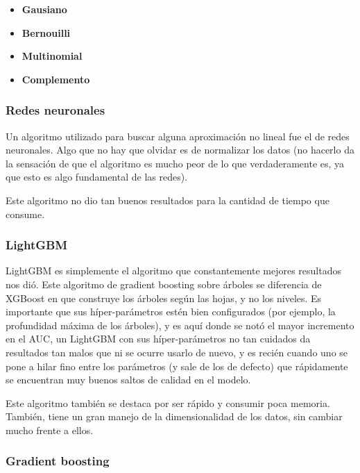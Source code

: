 \documentclass[a4paper]{article}
\begin{document}
\begin{itemize}
	\item \textbf{Gausiano}
	
	\item \textbf{Bernouilli}
	
	\item \textbf{Multinomial}	
	
 	\item \textbf{Complemento}
\end{itemize}


\subsubsection{Redes neuronales}

Un algoritmo utilizado para buscar alguna aproximación no lineal fue el de redes neuronales. Algo que no hay que olvidar es de normalizar los datos (no hacerlo da la sensación de que el algoritmo es mucho peor de lo que verdaderamente es, ya que esto es algo fundamental de las redes). 

Este algoritmo no dio tan buenos resultados para la cantidad de tiempo que consume.

\subsubsection{LightGBM}

LightGBM es simplemente el algoritmo que constantemente mejores resultados nos dió. Este algoritmo de gradient boosting sobre árboles se diferencia de XGBoost en que construye los árboles según las hojas, y no los niveles. Es importante que sus híper-parámetros estén bien configurados (por ejemplo, la profundidad máxima de los árboles), y es aquí donde se notó el mayor incremento en el AUC, un LightGBM con sus híper-parámetros no tan cuidados da resultados tan malos que ni se ocurre usarlo de nuevo, y es recién cuando uno se pone a hilar fino entre los parámetros (y sale de los de defecto) que rápidamente se encuentran muy buenos saltos de calidad en el modelo.

Este algoritmo también se destaca por ser rápido y consumir poca memoria. También, tiene un gran manejo de la dimensionalidad de los datos, sin cambiar mucho frente a ellos.

\subsubsection{Gradient boosting}
\end{document}
